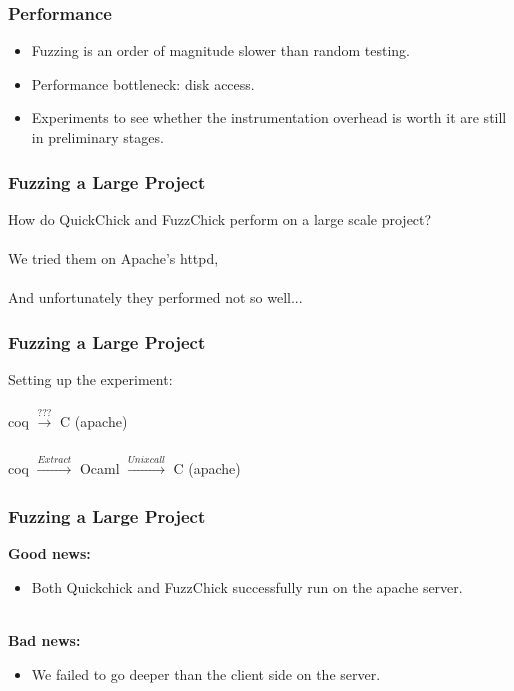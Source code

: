 \documentclass{beamer}
\begin{document}
\begin{frame}
  \frametitle{Performance}
  \begin{itemize}
  \item Fuzzing is an order of magnitude slower than random testing.
  \item Performance bottleneck: disk access.
  \item Experiments to see whether the instrumentation overhead is worth it are
    still in preliminary stages.
  \end{itemize}
\end{frame}

\begin{frame}
  \frametitle{Fuzzing a Large Project}
  How do QuickChick and FuzzChick perform on a large scale project? \\~\\
  
  \pause
  We tried them on Apache's httpd, \\~\\
  
  \pause
  And unfortunately they performed not so well...
    
\end{frame}

\begin{frame}
\frametitle{Fuzzing a Large Project}
Setting up the experiment: \\~\\

coq $\xrightarrow[]{???}$ C (apache) \\~\\

\pause{}
coq $\xrightarrow[]{Extract}$ Ocaml $\xrightarrow[]{Unix call}$ C (apache)

\end{frame}

\begin{frame}
\frametitle{Fuzzing a Large Project}

\textbf{Good news:}

\begin{itemize}
\item Both Quickchick and FuzzChick successfully run on the apache server. \\~\\
\end{itemize}


\pause{}
\textbf{Bad news:}

\begin{itemize}
\item We failed to go deeper than the client side on the server.
\end{itemize}


\end{frame}
\end{document}
